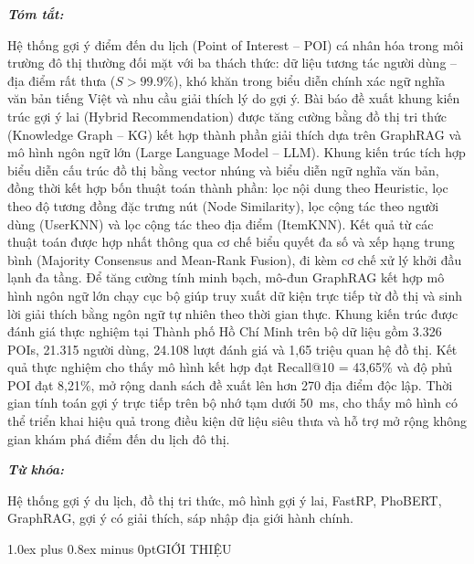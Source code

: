 \documentclass[journal,onecolumn,10pt]{IEEEtran}
\makeatletter
\renewcommand{\abstractname}{Tóm tắt}%
\renewcommand\IEEEkeywordsname{Từ khóa}
\renewenvironment{abstract}{%
  \normalfont\normalsize\textbf{\textit{\abstractname:}}\ \mdseries\ignorespaces
}{\relax}
\renewenvironment{IEEEkeywords}{%
  \normalfont\normalsize\textbf{\textit{\IEEEkeywordsname:}}\ \mdseries\ignorespaces
}{\relax}
\def\section{\@startsection{section}{1}{\z@}{2.2ex plus 1.2ex minus 0.4ex}%
{1.0ex plus 0.8ex minus 0pt}{\normalfont\normalsize\bfseries\centering}}
\makeatother
\begin{document}
\begin{abstract}
Hệ thống gợi ý điểm đến du lịch (Point of Interest -- POI) cá nhân hóa trong môi trường đô thị thường đối mặt với ba thách thức: dữ liệu tương tác người dùng -- địa điểm rất thưa ($S > 99.9\%$), khó khăn trong biểu diễn chính xác ngữ nghĩa văn bản tiếng Việt và nhu cầu giải thích lý do gợi ý. Bài báo đề xuất khung kiến trúc gợi ý lai (Hybrid Recommendation) được tăng cường bằng đồ thị tri thức (Knowledge Graph -- KG) kết hợp thành phần giải thích dựa trên GraphRAG và mô hình ngôn ngữ lớn (Large Language Model -- LLM). Khung kiến trúc tích hợp biểu diễn cấu trúc đồ thị bằng vector nhúng và biểu diễn ngữ nghĩa văn bản, đồng thời kết hợp bốn thuật toán thành phần: lọc nội dung theo Heuristic, lọc theo độ tương đồng đặc trưng nút (Node Similarity), lọc cộng tác theo người dùng (UserKNN) và lọc cộng tác theo địa điểm (ItemKNN). Kết quả từ các thuật toán được hợp nhất thông qua cơ chế biểu quyết đa số và xếp hạng trung bình (Majority Consensus and Mean-Rank Fusion), đi kèm cơ chế xử lý khởi đầu lạnh đa tầng. Để tăng cường tính minh bạch, mô-đun GraphRAG kết hợp mô hình ngôn ngữ lớn chạy cục bộ giúp truy xuất dữ kiện trực tiếp từ đồ thị và sinh lời giải thích bằng ngôn ngữ tự nhiên theo thời gian thực. Khung kiến trúc được đánh giá thực nghiệm tại Thành phố Hồ Chí Minh trên bộ dữ liệu gồm 3.326 POIs, 21.315 người dùng, 24.108 lượt đánh giá và 1,65 triệu quan hệ đồ thị. Kết quả thực nghiệm cho thấy mô hình kết hợp đạt Recall@10 = 43,65\% và độ phủ POI đạt 8,21\%, mở rộng danh sách đề xuất lên hơn 270 địa điểm độc lập. Thời gian tính toán gợi ý trực tiếp trên bộ nhớ tạm dưới 50~ms, cho thấy mô hình có thể triển khai hiệu quả trong điều kiện dữ liệu siêu thưa và hỗ trợ mở rộng không gian khám phá điểm đến du lịch đô thị.
\end{abstract}

\begin{IEEEkeywords}
Hệ thống gợi ý du lịch, đồ thị tri thức, mô hình gợi ý lai, FastRP, PhoBERT, GraphRAG, gợi ý có giải thích, sáp nhập địa giới hành chính.
\end{IEEEkeywords}

\section{GIỚI THIỆU}
\end{document}

